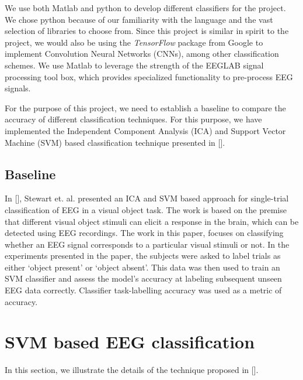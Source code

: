 \documentclass{article} %
\begin{document}
We use both Matlab and python to develop different classifiers for the project. We chose python because of our familiarity with the language and the vast selection of libraries to choose from. Since this project is similar in spirit to the  project, we would also be using the \textit{TensorFlow} package from Google to implement Convolution Neural Networks (CNNs), among other classification schemes. We use Matlab to leverage the strength of the EEGLAB signal processing tool box, which provides specialized functionality to pre-process EEG signals. 

For the purpose of this project, we need to establish a baseline to compare the accuracy of different classification techniques. For this purpose, we have implemented the Independent Component Analysis (ICA) and Support Vector Machine (SVM) based classification technique presented in [].

\subsection{Baseline}
In [], Stewart et. al. presented an ICA and SVM based approach for single-trial classification of EEG in a visual object task. The work is based on the premise that different visual object stimuli can elicit a response in the brain, which can be detected using EEG recordings. The work in this paper, focuses on classifying whether an EEG signal corresponds to a particular visual stimuli or not. In the experiments presented in the paper, the subjects were asked to label trials as either ‘object present’ or ‘object absent’. This data was then used to train an SVM classifier
and assess the model’s accuracy at labeling subsequent unseen EEG data correctly. Classifier task-labelling accuracy was used as a metric of accuracy. 

\section{SVM based EEG classification}
In this section, we illustrate the details of the technique proposed in [].
\end{document}
